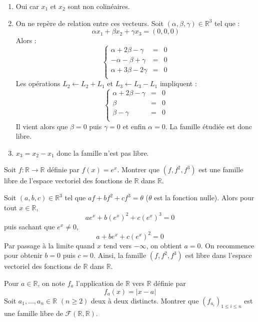 \documentclass[a4paper,10pt]{report}
\begin{document}
\begin{enumerate}
\item Oui car $x_1$ et $x_2$ sont non colinéaires.
\item On ne repère de relation entre ces vecteurs. Soit $(\alpha, \beta, \gamma) \in \mathbb{R}^3$ tel que :
$$ \alpha x_1 + \beta x_2 + \gamma x_3 = (0,0,0)$$
Alors :
$$ \left\lbrace \begin{array}{ccl}
\alpha + 2 \beta - \gamma & = & 0 \\
- \alpha - \beta + \gamma & = & 0 \\
\alpha+ 3 \beta -2 \gamma & = & 0 \\
\end{array}\right.$$
Les opérations $L_2 \leftarrow L_2+L_1$ et $L_3 \leftarrow L_3- L_1$ impliquent :
$$ \left\lbrace \begin{array}{rcl}
\alpha + 2 \beta - \gamma & = & 0 \\
  \beta & = & 0 \\
  \beta - \gamma & = & 0 \\
\end{array}\right.$$
Il vient alors que $\beta=0$ puis $\gamma=0$ et enfin $\alpha=0$. La famille étudiée est donc libre.
\item $x_3=x_2-x_1$ donc la famille n'est pas libre.
\end{enumerate}

\medskip


\begin{Exercice}{} Soit $f : \mathbb{R} \rightarrow \mathbb{R}$ définie par $f(x)=e^x$. Montrer que $(f,f^2,f^3)$ est une famille libre de l'espace vectoriel des fonctions de $\mathbb{R}$ dans $\mathbb{R}$.
\end{Exercice}

\corr Soit $(a,b,c) \in \mathbb{R}^3$ tel que $af+bf^2+cf^3 = \theta$ ($\theta$ est la fonction nulle). Alors pour tout $x \in \mathbb{R}$,
$$ a e^x+ b (e^x)^2 + c(e^x)^3 = 0 $$
puis sachant que $e^x \neq 0$,
$$ a + be^x + c (e^x)^2 = 0$$
Par passage à la limite quand $x$ tend vers $- \infty$, on obtient $a=0$. On recommence pour obtenir $b=0$ puis $c=0$. Ainsi, la famille $(f,f^2,f^3)$ est libre dans l'espace vectoriel des fonctions de $\mathbb{R}$ dans $\mathbb{R}$.

\medskip

\begin{Exercice}{} Pour $a \in \mathbb{R}$, on note $f_a$ l'application de $\mathbb{R}$ vers $\mathbb{R}$ définie par 
$$f_a(x) = \vert x - a \vert$$
Soit $a_1, \ldots, a_n \in \mathbb{R}$ $(n \geq 2)$ deux à deux distincts. Montrer que $(f_{a_i})_{1 \leq i \leq n}$ est une famille libre de $\mathcal{F}(\mathbb{R}, \mathbb{R})$.
\end{Exercice} 
\end{document}

